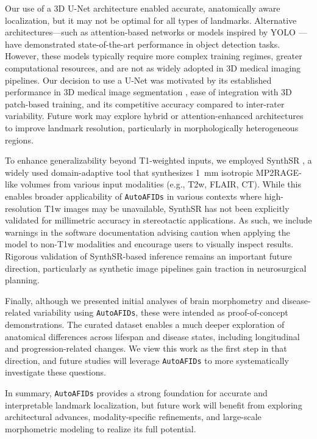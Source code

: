 Our use of a 3D U-Net architecture enabled accurate, anatomically aware localization, but it may not be optimal for all types of landmarks. Alternative architectures—such as attention-based networks or models inspired by YOLO \cite{Redmon2015-ia}—have demonstrated state-of-the-art performance in object detection tasks. However, these models typically require more complex training regimes, greater computational resources, and are not as widely adopted in 3D medical imaging pipelines. Our decision to use a U-Net was motivated by its established performance in 3D medical image segmentation \cite{Cicek2016-dz}, ease of integration with 3D patch-based training, and its competitive accuracy compared to inter-rater variability. Future work may explore hybrid or attention-enhanced architectures to improve landmark resolution, particularly in morphologically heterogeneous regions.

To enhance generalizability beyond T1-weighted inputs, we employed SynthSR \cite{Iglesias2023-co}, a widely used domain-adaptive tool that synthesizes 1~mm isotropic MP2RAGE-like volumes from various input modalities (e.g., T2w, FLAIR, CT). While this enables broader applicability of \texttt{AutoAFIDs} in various contexts where high-resolution T1w images may be unavailable, SynthSR has not been explicitly validated for millimetric accuracy in stereotactic applications. As such, we include warnings in the software documentation advising caution when applying the model to non-T1w modalities and encourage users to visually inspect results. Rigorous validation of SynthSR-based inference remains an important future direction, particularly as synthetic image pipelines gain traction in neurosurgical planning.

Finally, although we presented initial analyses of brain morphometry and disease-related variability using \texttt{AutoAFIDs}, these were intended as proof-of-concept demonstrations. The curated dataset enables a much deeper exploration of anatomical differences across lifespan and disease states, including longitudinal and progression-related changes. We view this work as the first step in that direction, and future studies will leverage \texttt{AutoAFIDs} to more systematically investigate these questions.

In summary, \texttt{AutoAFIDs} provides a strong foundation for accurate and interpretable landmark localization, but future work will benefit from exploring architectural advances, modality-specific refinements, and large-scale morphometric modeling to realize its full potential.

